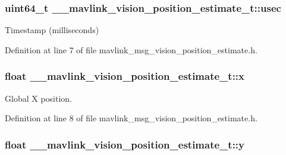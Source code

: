 \hypertarget{struct____mavlink__vision__position__estimate__t_a872bda48e28f4e270e7ad51071a55ac2}{
\subsubsection[{usec}]{\setlength{\rightskip}{0pt plus 5cm}uint64\-\_\-t \-\_\-\-\_\-mavlink\-\_\-vision\-\_\-position\-\_\-estimate\-\_\-t\-::usec}}\label{struct____mavlink__vision__position__estimate__t_a872bda48e28f4e270e7ad51071a55ac2}


Timestamp (milliseconds) 



Definition at line 7 of file mavlink\-\_\-msg\-\_\-vision\-\_\-position\-\_\-estimate.\-h.

\hypertarget{struct____mavlink__vision__position__estimate__t_af418f4744f2e73a69c5d8fa2b66a83df}{
\subsubsection[{x}]{\setlength{\rightskip}{0pt plus 5cm}float \-\_\-\-\_\-mavlink\-\_\-vision\-\_\-position\-\_\-estimate\-\_\-t\-::x}}\label{struct____mavlink__vision__position__estimate__t_af418f4744f2e73a69c5d8fa2b66a83df}


Global X position. 



Definition at line 8 of file mavlink\-\_\-msg\-\_\-vision\-\_\-position\-\_\-estimate.\-h.

\hypertarget{struct____mavlink__vision__position__estimate__t_accc56a76ae057c7761c4d9024ea7f09b}{
\subsubsection[{y}]{\setlength{\rightskip}{0pt plus 5cm}float \-\_\-\-\_\-mavlink\-\_\-vision\-\_\-position\-\_\-estimate\-\_\-t\-::y}}\label{struct____mavlink__vision__position__estimate__t_accc56a76ae057c7761c4d9024ea7f09b}


